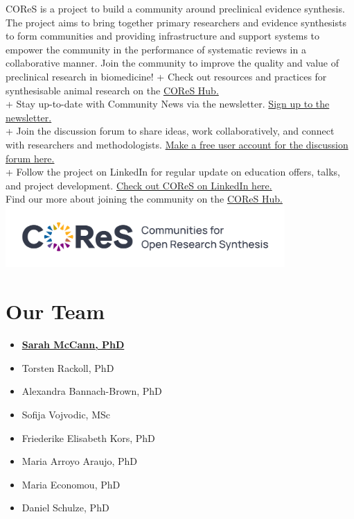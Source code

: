 \documentclass[
]{book}
\providecommand{\tightlist}{%
  \setlength{\itemsep}{0pt}\setlength{\parskip}{0pt}}
\begin{document}
COReS is a project to build a community around preclinical evidence synthesis. The project aims to bring together primary researchers and evidence synthesists to form communities and providing infrastructure and support systems to empower the community in the performance of systematic reviews in a collaborative manner. Join the community to improve the quality and value of preclinical research in biomedicine!
+ Check out resources and practices for synthesisable animal research on the \href{www.cores-hub.io}{COReS Hub.}\\
+ Stay up-to-date with Community News via the newsletter. \href{http://eepurl.com/h4hsMv}{Sign up to the newsletter.}\\
+ Join the discussion forum to share ideas, work collaboratively, and connect with researchers and methodologists. \href{www.cores.zulipchat.com}{Make a free user account for the discussion forum here.}\\
+ Follow the project on LinkedIn for regular update on education offers, talks, and project development. \href{https://www.linkedin.com/company/communities-for-open-research-synthesis/}{Check out COReS on LinkedIn here.}\\
Find our more about joining the community on the \href{https://cores-hub.io/cores-join-the-community/}{COReS Hub.}
\includegraphics[width=0.8\textwidth,height=\textheight]{figs/cores-logo.png}

\section{Our Team}\label{our-team}

\begin{itemize}
\tightlist
\item
  \textbf{\href{https://www.bihealth.org/en/quest/teams/team/research-group-mccann}{Sarah McCann, PhD}}
\item
  Torsten Rackoll, PhD
\item
  Alexandra Bannach-Brown, PhD
\item
  Sofija Vojvodic, MSc
\item
  Friederike Elisabeth Kors, PhD
\item
  Maria Arroyo Araujo, PhD
\item
  Maria Economou, PhD
\item
  Daniel Schulze, PhD
\end{itemize}
\end{document}
